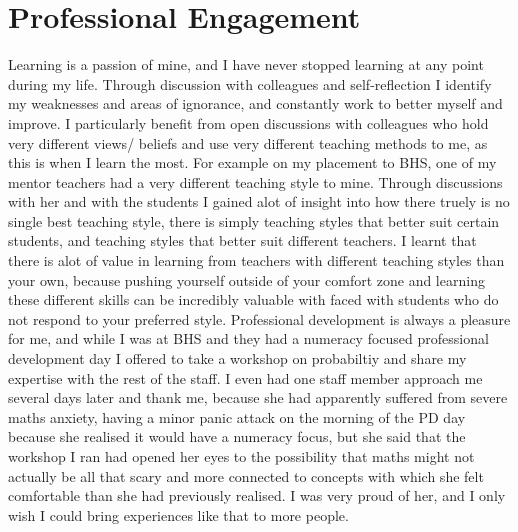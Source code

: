 \documentclass[a4paper,12pt]{report}
\begin{document}
\section*{Professional Engagement}

Learning is a passion of mine, and I have never stopped learning at any point during my life. Through discussion with colleagues and self-reflection I identify my weaknesses and areas of ignorance, and constantly work to better myself and improve. I particularly benefit from open discussions with colleagues who hold very different views/ beliefs and use very different teaching methods to me, as this is when I learn the most. For example on my placement to BHS, one of my mentor teachers had a very different teaching style to mine. Through discussions with her and with the students I gained alot of insight into how there truely is no single best teaching style, there is simply teaching styles that better suit certain students, and teaching styles that better suit different teachers. I learnt that there is alot of value in learning from teachers with different teaching styles than your own, because pushing yourself outside of your comfort zone and learning these different skills can be incredibly valuable with faced with students who do not respond to your preferred style. Professional development is always a pleasure for me, and while I was at BHS and they had a numeracy focused professional development day I offered to take a workshop on probabiltiy and share my expertise with the rest of the staff. I even had one staff member approach me several days later and thank me, because she had apparently suffered from severe maths anxiety, having a minor panic attack on the morning of the PD day because she realised it would have a numeracy focus, but she said that the workshop I ran had opened her eyes to the possibility that maths might not actually be all that scary and more connected to concepts with which she felt comfortable than she had previously realised. I was very proud of her, and I only wish I could bring experiences like that to more people.
\end{document}
